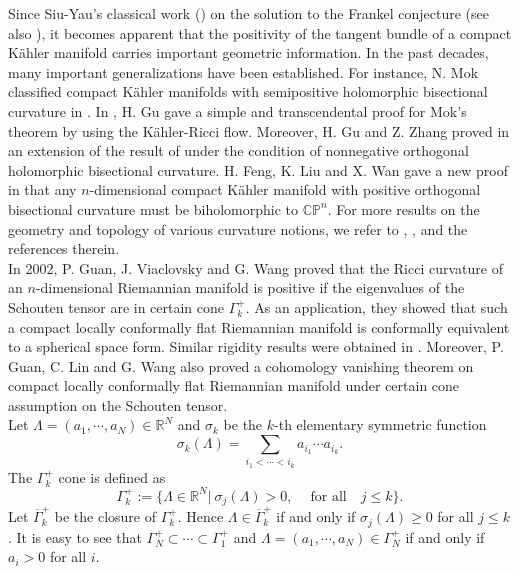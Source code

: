 \documentclass[12pt]{amsart}
\theoremstyle{plain}
\theoremstyle{definition}
\renewcommand{\bar}{\overline}
\newcommand{\beq}{\begin{equation}}
\newcommand{\eeq}{\end{equation}}
\newcommand{\qtq}[1]{\quad\mbox{#1}\quad}
\renewcommand{\>}{\rightarrow}
\renewcommand{\P}{{\mathbb P}}
\numberwithin{equation}{section} %
\begin{document}
	
	Since  Siu-Yau's classical work (\cite{SiuYau1980}) on the solution  to the  Frankel conjecture (see also \cite{Mori1979}), it becomes apparent that the positivity of the tangent bundle of a compact K\"ahler manifold carries important geometric information. In the past decades, many important generalizations have been established. 	For instance, N. Mok  classified compact K\"ahler manifolds with semipositive holomorphic bisectional curvature in \cite{Mok1988}. In  \cite{Gu2009} ,  H. Gu gave a simple and transcendental proof for Mok's theorem by using the K\"ahler-Ricci flow. Moreover, H.  Gu and Z.  Zhang  proved in \cite{GuZhang2010} an extension of the result of \cite{Mok1988} under the condition of nonnegative orthogonal holomorphic bisectional curvature.  H. Feng, K. Liu and X. Wan  gave a new proof in \cite{FengLiuWan2017} that any $n$-dimensional compact K\"ahler manifold with positive orthogonal bisectional curvature must be biholomorphic to $\mathbb{C}\P^n$. For more results on the geometry and topology of various curvature notions,  we refer to \cite{Che07},  \cite{Wil13}, \cite{Li23} and \cite{CGT23} the references therein. \\
	
	
	
	In 2002, P. Guan, J. Viaclovsky and G. Wang \cite{GuanViaclovskyWang2002} proved that the Ricci curvature of an $n$-dimensional Riemannian manifold is positive if the eigenvalues of the Schouten tensor are in  certain cone $\Gamma_k^+$. 
	As an application, they showed that such a compact locally conformally flat Riemannian manifold is conformally equivalent to a spherical space form. Similar rigidity results were obtained in \cite{GuanLinWang2004,GuanWang2004,Gursky1994}. Moreover, P. Guan, C.  Lin and G. Wang \cite{GuanLinWang2005} also proved a cohomology vanishing theorem on compact locally conformally flat Riemannian manifold under certain cone assumption on the Schouten tensor.\\
	
	
Let $\Lambda=(a_1,\cdots,a_N)\in\mathbb{R}^N$ and  $\sigma_k$ be the $k$-th elementary symmetric function
$$\sigma_k(\Lambda)=\sum_{i_1<\cdots<i_k}a_{i_1}\cdots a_{i_k}.$$
The $\Gamma_k^+$ cone is defined as
\beq \Gamma_k^+:=\{\Lambda\in\mathbb{R}^N|\ \sigma_j(\Lambda)>0,\ \qtq{for all} j\leq k\}.\eeq 
Let $\bar{\Gamma}_k^+$  be  the closure of $\Gamma_k^+$. Hence 	$\Lambda \in \bar\Gamma^+_k$ if and only if  $\sigma_j(\Lambda)\geq 0$ for all $j\leq k$. It is  easy to see that $\Gamma_N^+\subset \cdots \subset \Gamma_1^+$ and
$\Lambda=(a_1,\cdots,a_N) \in \Gamma^+_N$ if and only if $a_i>0$ for all $i$.\\
	
\end{document}
